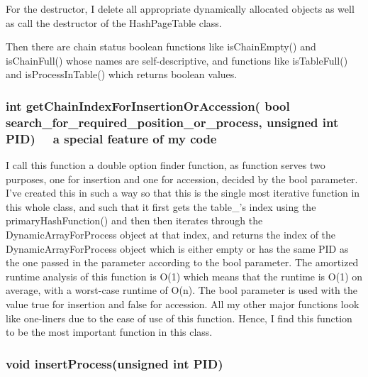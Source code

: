 \documentclass[a4paper]{article}
\begin{document}
    For the destructor, I delete all appropriate dynamically allocated objects as well as call the destructor of the {\color{draculapurple}HashPageTable} class.

    Then there are chain status boolean functions like {\color{draculapurple}isChainEmpty()} and
        {\color{draculapurple}isChainFull()} whose names are self-descriptive, and functions like
        {\color{draculapurple}isTableFull()} and {\color{draculapurple}isProcessInTable()} which returns boolean values.

    \subsubsection{{\color{orange}int} {\color{draculapurple}getChainIndexForInsertionOrAccession}( {\color{orange}bool} search\_for\_required\_position\_or\_process, {\color{orange}unsigned int} PID)
        \faStar~~{\color{Awesome}a special feature of my code}~~\faStar}
    I call this function a double option finder function, as function serves two purposes, one for insertion and one for accession, decided by the {\color{orange}bool} parameter.
    I've created this in such a way so that this is the single most iterative function in this whole class, and such that it
    first gets the {\color{Turquoise}table\_}'s index using the {\color{draculapurple}primaryHashFunction()} and then then
    iterates through the {\color{draculapurple}DynamicArrayForProcess} object at that index, and returns the index of the
            {\color{draculapurple}DynamicArrayForProcess} object which is either empty or has the same {\color{draculapurple}PID} as the one passed in the parameter according to the
            {\color{orange}bool} parameter. The amortized runtime analysis of this function is {\color{lightblue}O(1)} which means that the runtime is {\color{lightblue}O(1)} on average, with a worst-case runtime of {\color{lightblue}O(n)}.
    The {\color{orange}bool} parameter is used with the value {\color{LightPink}true} for insertion and {\color{LightPink}false} for accession.
    All my other major functions look like {\color{GoldenYellow}one-liners} due to the ease of use of this function. Hence, I find this function to be the most important function in this class.

    \subsubsection{{\color{orange}void} {\color{draculapurple}insertProcess}({\color{orange}unsigned int} PID)}
\end{document}
